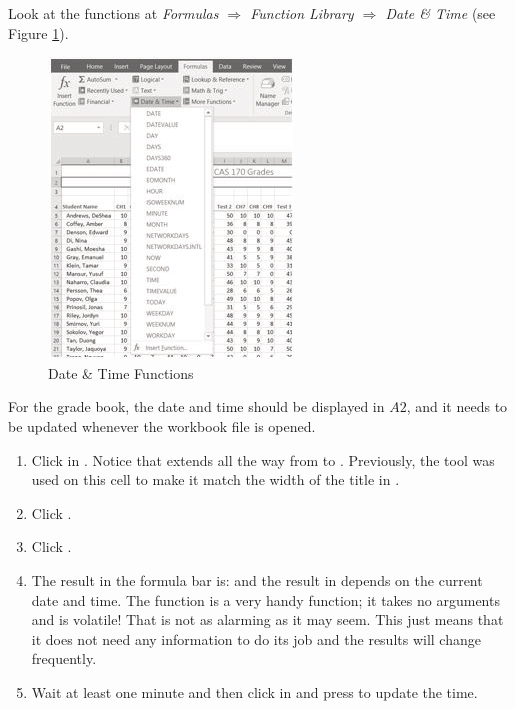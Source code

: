 Look at the functions at \textit{Formulas $ \Rightarrow $ Function Library $ \Rightarrow $ Date \& Time} (see Figure \ref{03:fig16}).

\begin{figure}[H]
	\centering
	\includegraphics[width=\maxwidth{.95\linewidth}]{gfx/ch03_fig16}
	\caption{Date \& Time Functions}
	\label{03:fig16}
\end{figure}

For the grade book, the date and time should be displayed in $ A2 $, and it needs to be updated whenever the workbook file is opened.

\begin{enumerate}
	\item Click in . Notice that  extends all the way from  to . Previously, the  tool was used on this cell to make it match the width of the title in .
	\item Click . 
	\item Click .
	\item The result in the formula bar is:  and the result in  depends on the current date and time. The  function is a very handy function; it takes no arguments and is volatile! That is not as alarming as it may seem. This just means that it does not need any information to do its job and the results will change frequently. 
	\item Wait at least one minute and then click in  and press  to update the time.
\end{enumerate}

